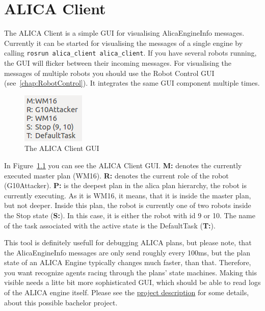 \chapter{ALICA Client}
\label{chap:ALICAClient}

The ALICA Client is a simple GUI for visualising AlicaEngineInfo messages. Currently it can be started for visualising the messages of a single engine by calling \verb#rosrun alica_client alica_client#. If you have several robots running, the GUI will flicker between their incoming messages. For visualising the messages of multiple robots you should use the Robot Control GUI (see~\ref{chap:RobotControl}). It integrates the same GUI component multiple times.

\begin{figure}[htbp]
 \centering
 \includegraphics[scale=0.8]{img/AlicaClient.png}
 \caption{The ALICA Client GUI}
 \label{fig:ALICAClient}
\end{figure}

In Figure~\ref{fig:ALICAClient} you can see the ALICA Client GUI. \textbf{M:} denotes the currently executed master plan (WM16). \textbf{R:} denotes the current role of the robot (G10Attacker). \textbf{P:} is the deepest plan in the alica plan hierarchy, the robot is currently executing. As it is WM16, it means, that it is inside the master plan, but not deeper. Inside this plan, the robot is currently one of two robots inside the Stop state (\textbf{S:}). In this case, it is either the robot with id 9 or 10. The name of the task associated with the active state is the DefaultTask (\textbf{T:}).

This tool is definitely usefull for debugging ALICA plans, but please note, that the AlicaEngineInfo messages are only send roughly every 100ms, but the plan state of an ALICA Engine typically changes much faster, than that. Therefore, you want recognize agents racing through the plans' state machines. Making this visible needs a litte bit more sophisticated GUI, which should be able to read logs of the ALICA engine itself. Please see the \href{http://www.uni-kassel.de/eecs/fileadmin/datas/fb16/Fachgebiete/VS/Documents/ProjectsAndTheses/alica_client.pdf}{project description} for some details, about this possible bachelor project.



